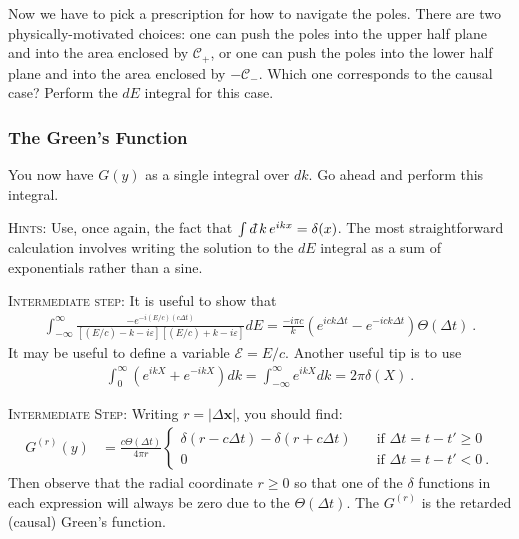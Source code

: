 \documentclass[12pt]{article}
\numberwithin{equation}{subsection}    %
\renewcommand{\vec}[1]{\mathbf{#1}} %
\newcommand{\dbar}{d\mkern-6mu\mathchar'26}    %
\begin{document}
Now we have to pick a prescription for how to navigate the poles. There are two physically-motivated choices: one can push the poles into the upper half plane and into the area enclosed by $\mathcal C_+$, or one can push the poles into the lower half plane and into the area enclosed by $-{\mathcal C}_-$. Which one corresponds to the causal case? Perform the $dE$ integral for this case.


\subsubsection{The Green's Function}

You now have $G(y)$ as a single integral over $dk$. Go ahead and perform this integral. 

\textsc{Hints}: Use, once again, the fact that $\int \dbar k\, e^{ikx} = \delta(x)$. The most straightforward calculation involves writing the solution to the $dE$ integral as a sum of exponentials rather than a sine. 

\textsc{Intermediate step}: It is useful to show that
\begin{align}
	\int_{-\infty}^\infty \frac{-e^{-i(E/c)(c\Delta t)}}{[(E/c)- k - i\varepsilon][(E/c)+k - i\varepsilon]}  dE = 
	\frac{-i\pi c}{k} \left(e^{ick\Delta t}-e^{-ick\Delta t}\right) 
	\Theta(\Delta t)
	\ .
\end{align}
It may be useful to define a variable $\mathcal E = E/c$.
%
Another useful tip is to use
\begin{align}
	\int_0^\infty \left(e^{ikX} + e^{-ikX}\right) dk = 
	\int_{-\infty}^\infty e^{ikX} dk=
	2\pi \delta(X)
	 \ .
\end{align}


\textsc{Intermediate Step}: Writing $r = |\Delta \vec x|$, you should find:
\begin{align}
	G^{(r)}(y) &=
	\frac{c\Theta(\Delta t)}{4\pi r}
	\left\{
	\begin{array}{ll}
		\delta(r-c\Delta t) - \delta(r+c\Delta t)
		&
		\quad\text{if $\Delta t=t-t' \geq 0$}
		\\
		0 & \quad\text{if $\Delta t=t-t' <0$} \ .
	\end{array}
	\right.
	\label{eq:Gr:Gs}
\end{align}
Then observe that the radial coordinate $r\geq 0$ so that one of the $\delta$ functions in each expression will always be zero due to the $\Theta(\Delta t)$. The $G^{(r)}$ is the retarded (causal) Green's function.
\end{document}
